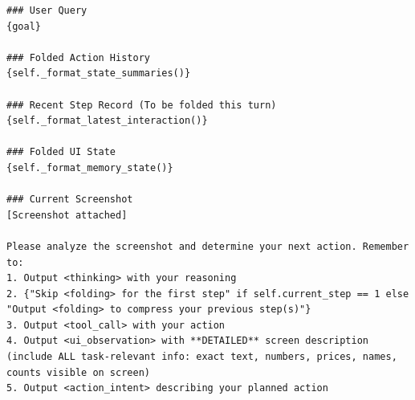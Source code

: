 \documentclass{llmxive}
\begin{document}
\begin{tcolorbox}[
  promptstyle,
  title=\texttt{Prompt for MemGUI-Agent (per-step user prompt).},
]
\begin{Verbatim}[fontsize=\scriptsize,breaklines,breakanywhere]
### User Query
{goal}

### Folded Action History
{self._format_state_summaries()}

### Recent Step Record (To be folded this turn)
{self._format_latest_interaction()}

### Folded UI State
{self._format_memory_state()}

### Current Screenshot
[Screenshot attached]

Please analyze the screenshot and determine your next action. Remember to:
1. Output <thinking> with your reasoning
2. {"Skip <folding> for the first step" if self.current_step == 1 else "Output <folding> to compress your previous step(s)"}
3. Output <tool_call> with your action
4. Output <ui_observation> with **DETAILED** screen description (include ALL task-relevant info: exact text, numbers, prices, names, counts visible on screen)
5. Output <action_intent> describing your planned action
\end{Verbatim}
\end{tcolorbox}
\end{document}
